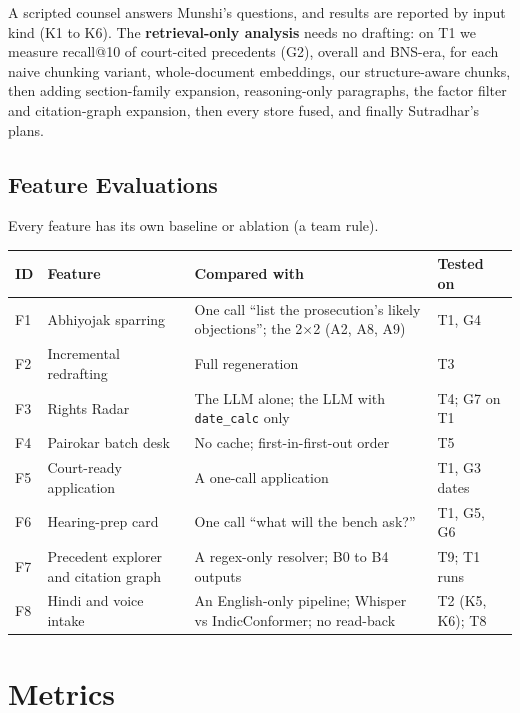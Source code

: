 \documentclass[10pt,a4paper]{article}
\newcommand{\st}[1]{\texttt{\small #1}}
\begin{document}
A scripted counsel answers Munshi's questions, and results are reported by input kind (K1 to K6). The \textbf{retrieval-only analysis} needs no drafting: on T1 we measure recall@10 of court-cited precedents (G2), overall and BNS-era, for each naive chunking variant, whole-document embeddings, our structure-aware chunks, then adding section-family expansion, reasoning-only paragraphs, the factor filter and citation-graph expansion, then every store fused, and finally Sutradhar's plans.

\subsection{Feature Evaluations}

Every feature has its own baseline or ablation (a team rule).

{\small
\begin{xltabular}{\linewidth}{@{}>{\raggedright\arraybackslash{}\hsize}X>{\raggedright\arraybackslash{}\hsize}X>{\raggedright\arraybackslash{}\hsize}X>{\raggedright\arraybackslash{}\hsize}X@{}}
\toprule
\textbf{ID} & \textbf{Feature} & \textbf{Compared with} & \textbf{Tested on} \\
\midrule
\endhead
F1 & Abhiyojak sparring & One call ``list the prosecution's likely objections''; the 2$\times$2 (A2, A8, A9) & T1, G4 \\
F2 & Incremental redrafting & Full regeneration & T3 \\
F3 & Rights Radar & The LLM alone; the LLM with \st{date\_\allowbreak{}calc} only & T4; G7 on T1 \\
F4 & Pairokar batch desk & No cache; first-in-first-out order & T5 \\
F5 & Court-ready application & A one-call application & T1, G3 dates \\
F6 & Hearing-prep card & One call ``what will the bench ask?'' & T1, G5, G6 \\
F7 & Precedent explorer and citation graph & A regex-only resolver; B0 to B4 outputs & T9; T1 runs \\
F8 & Hindi and voice intake & An English-only pipeline; Whisper vs IndicConformer; no read-back & T2 (K5, K6); T8 \\
\bottomrule
\end{xltabular}}

\section{Metrics}
\end{document}
